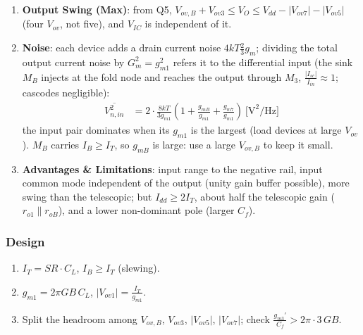 \begin{enumerate}
    \paragraph{At Input:} \(I_G = 0\): \(Z_{in} \to \infty\) at DC.
    \paragraph{At Output:} \(Z_{out} = Z_{dn} \parallel Z_{up}\) per side.
  \item \textbf{Output Swing (Max)}: from Q5, \(V_{ov,B} + V_{ov3} \leq V_{O} \leq V_{dd} - |V_{ov7}| - |V_{ov5}|\)
    (four \(V_{ov}\), not five), and \(V_{IC}\) is independent of it.
  \item \textbf{Noise}: each device adds a drain current noise \(4kT\frac{2}{3}g_m\); dividing the total output
    current noise by \(G_m^2 = g_{m1}^2\) refers it to the differential input (the sink \(M_B\) injects at the fold node and reaches the output through \(M_3\), \(\frac{|I_{sc}|}{I_{in}} \approx 1\); cascodes negligible):
    \begin{align*}
      \overline{V_{n,in}^2} &= 2\cdot\frac{8kT}{3 g_{m1}}\left(1 + \frac{g_{mB}}{g_{m1}} + \frac{g_{m7}}{g_{m1}}\right) \ \text{[V}^2\text{/Hz]}
    \end{align*}
    the input pair dominates when its \(g_{m1}\) is the largest (load devices at large \(V_{ov}\)).
    \(M_B\) carries \(I_B \geq I_T\), so \(g_{mB}\) is large: use a large \(V_{ov,B}\) to keep it small.
  \item \textbf{Advantages \& Limitations}: input range to the negative rail, input common mode
    independent of the output (unity gain buffer possible), more swing than the telescopic;
    but \(I_{dd} \geq 2 I_T\), about half the telescopic gain (\(r_{o1} \parallel r_{oB}\)), and a lower
    non-dominant pole (larger \(C_f\)).
\end{enumerate}

\subsubsection{Design}
\begin{enumerate}
  \item \(I_T = SR \cdot C_L\), \(I_B \geq I_T\) (slewing).
  \item \(g_{m1} = 2\pi GB\, C_L\), \(|V_{ov1}| = \frac{I_T}{g_{m1}}\).
  \item Split the headroom among \(V_{ov,B}\), \(V_{ov3}\), \(|V_{ov5}|\), \(|V_{ov7}|\); check
    \(\frac{g_{m3}'}{C_f} > 2\pi \cdot 3\,GB\).
\end{enumerate}

